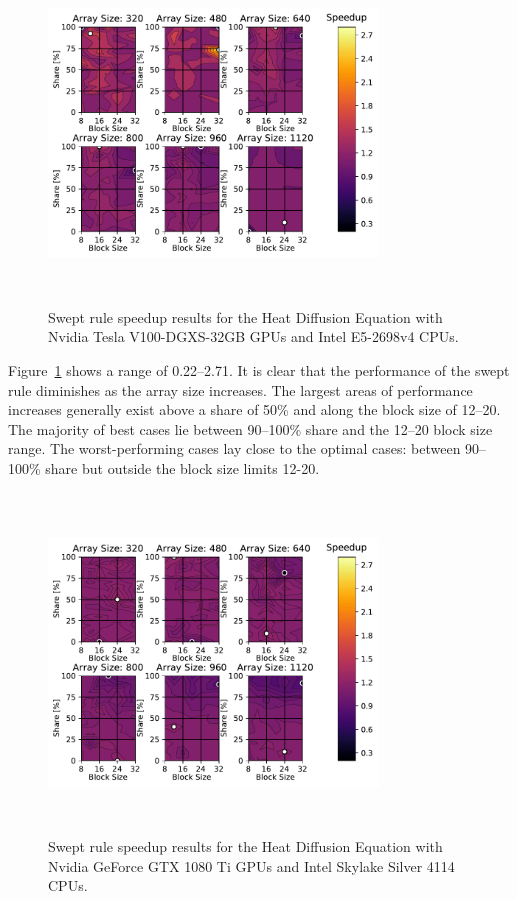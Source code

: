 \documentclass[preprints,article,accept,moreauthors,pdftex]{Definitions/mdpi}
\def\oldCPU{Intel Skylake Silver 4114} %
\def\oldGPU{Nvidia GeForce GTX 1080 Ti}
\def\newCPU{Intel E5-2698v4} %
\def\newGPU{Nvidia Tesla V100-DGXS-32GB}
\begin{document}
\begin{figure}[htbp]
    \centering
    \includegraphics[height=9cm,width=0.78\textwidth, trim={0.75cm 0.4cm 0.8cm 0.7cm},clip]{figs/speedUpheatNew.pdf}
    \caption{Swept rule speedup results for the Heat Diffusion Equation with \newGPU{} GPUs and \newCPU{} CPUs.}
    \label{fig:newSpeedupHeat}
\end{figure}

Figure~\ref{fig:newSpeedupHeat} shows a range of 0.22--2.71. 
It is clear that the performance of the swept rule diminishes as the array size increases. The largest areas of performance increases generally exist above a share of 50\% and along the block size of 12--20. The majority of best cases lie between 90--100\% share and the 12--20 block size range. 
The worst-performing cases lay close to the optimal cases: between 90--100\% share but outside the block size limits 12-20.

\begin{figure}[htbp]
    \centering
    \includegraphics[height=9cm,width=0.78\textwidth, trim={0.75cm 0.4cm 0.8cm 0.7cm},clip]{figs/speedUpheatOld.pdf}
    \caption{Swept rule speedup results for the Heat Diffusion Equation with \oldGPU{} GPUs and \oldCPU{} CPUs.}
    \label{fig:oldSpeedupHeat} 
\end{figure}
\end{document}

